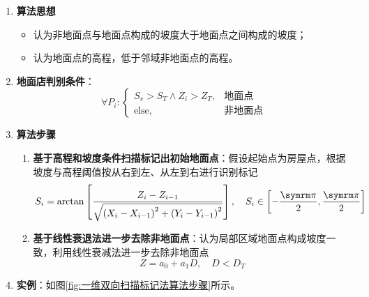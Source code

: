 \begin{enumerate}
	\item \textbf{算法思想}
		\begin{itemize}
			\item 认为非地面点与地面点构成的坡度大于地面点之间构成的坡度；
			\item 认为地面点的高程，低于邻域非地面点的高程。
		\end{itemize}
	\item \textbf{地面店判别条件}：
		\begin{equation}
		\forall P_i : \left\lbrace \begin{array}{ll}
		S_v > S_T ∧ Z_i > Z_T, & \text{地面点} \\
		\text{else},			& \text{非地面点}
		\end{array} \right.
		\end{equation}
	\item \textbf{算法步骤}
		\begin{enumerate}
			\item \textbf{基于高程和坡度条件扫描标记出初始地面点}：假设起始点为房屋点，根据坡度与高程阈值按从右到左、从左到右进行识别标记
				\begin{equation}
				S_i = \arctan \left[ \dfrac{Z_i - Z_{i-1}}{\sqrt{\left(X_i - X_{i-1}\right)^2 + \left(Y_i - Y_{i-1}\right)^2}} \right],\quad S_i \in \left[-\dfrac{\cpi}{2}, \dfrac{\cpi}{2}\right]
				\end{equation}
			\item \textbf{基于线性衰退法进一步去除非地面点}：认为局部区域地面点构成坡度一致，利用线性衰减法进一步去除非地面点
				\begin{equation}
				Z = a_0 + a_1D, \quad D < D_T
				\end{equation}
		\end{enumerate}
	\item \textbf{实例}：如图\ref{fig:一维双向扫描标记法算法步骤}所示。
		\begin{figure}[htbp]
			\centering
			 \quad
			 \quad

\end{figure}
\end{enumerate}
